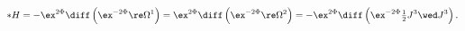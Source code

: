 \begin{equation}
\label{spinSU4H}
  *H= - \ex^{2\Phi}\diff \left(\ex^{-2\Phi}\re\Omega^1\right) 
       = \ex^{2\Phi}\diff \left(\ex^{-2\Phi}\re\Omega^2\right) 
       = -\ex^{2\Phi}\diff
          \left(\ex^{-2\Phi}\tfrac{1}{2}J^3\wed J^3\right) .
\end{equation}

